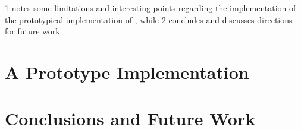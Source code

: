 \documentclass[12pt]{book}
\begin{document}
\cref{chapter:prototype} notes some limitations and interesting points
regarding the implementation of the prototypical implementation of \Fajita,
while \cref{chapter:conclusions} concludes and discusses directions for future
work.

\begin{comment} %
\chapter{Formal Language Recognition with the Java Type Checker}
\Large Based on an article accepted to ECOOP'16~\cite{Gil:Levy:2016}
\label{chapter:ecoop}
\normalsize


\chapter{An Algorithm for Generating Fluent APIs for Java}
\Large Based on an article submitted to OOPSLA'16~\cite{Gil:Levy:2016a}
\label{chapter:oopsla}
\normalsize

\end{comment} %

\chapter{A Prototype Implementation}
\label{chapter:prototype}


\chapter{Conclusions and Future Work}
\label{chapter:conclusions}





\end{document}
